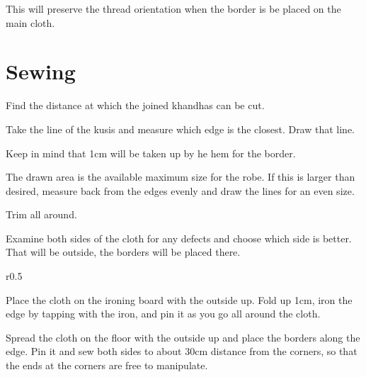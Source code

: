 This will preserve the thread orientation when the border is be placed
on the main cloth.

\setlength{\nextPhotoWidth}{0.5\textwidth}


\clearpage

\section{Sewing}

Find the distance at which the joined khandhas can be cut.

Take the line of the kusis and measure which edge is the closest. Draw
that line.

\setlength{\nextPhotoWidth}{0.5\textwidth}


\setlength{\nextPhotoWidth}{0.5\textwidth}


\setlength{\nextPhotoWidth}{0.5\textwidth}


Keep in mind that 1cm will be taken up by he hem for the border.

The drawn area is the available maximum size for the robe. If this is
larger than desired, measure back from the edges evenly and draw the
lines for an even size.

Trim all around.

Examine both sides of the cloth for any defects and choose which side is
better. That will be outside, the borders will be placed there.

\setlength{\nextPhotoWidth}{0.5\textwidth}

\begin{wrapfigure}{r}{0.5\textwidth}


\end{wrapfigure}

Place the cloth on the ironing board with the outside up. Fold up 1cm,
iron the edge by tapping with the iron, and pin it as you go all around
the cloth.

Spread the cloth on the floor with the outside up and place the borders
along the edge. Pin it and sew both sides to about 30cm distance from
the corners, so that the ends at the corners are free to manipulate.

